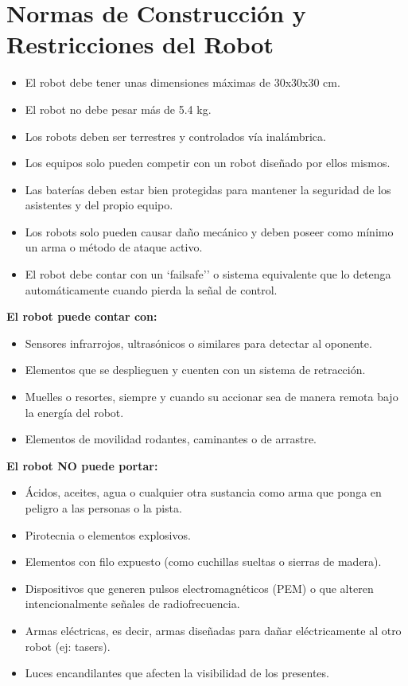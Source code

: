 \documentclass[12pt,a4paper]{article}
\begin{document}
\section*{Normas de Construcción y Restricciones del Robot}
\begin{itemize}
    \item El robot debe tener unas dimensiones máximas de 30x30x30 cm.
    \item El robot no debe pesar más de 5.4 kg.
    \item Los robots deben ser terrestres y controlados vía inalámbrica.
    \item Los equipos solo pueden competir con un robot diseñado por ellos mismos.
    \item Las baterías deben estar bien protegidas para mantener la seguridad de los asistentes y del propio equipo.
    \item Los robots solo pueden causar daño mecánico y deben poseer como mínimo un arma o método de ataque activo.
    \item El robot debe contar con un `failsafe'' o sistema equivalente que lo detenga automáticamente cuando pierda la señal de control.
\end{itemize}

\textbf{El robot puede contar con:}
\begin{itemize}
    \item Sensores infrarrojos, ultrasónicos o similares para detectar al oponente.
    \item Elementos que se desplieguen y cuenten con un sistema de retracción.
    \item Muelles o resortes, siempre y cuando su accionar sea de manera remota bajo la energía del robot.
    \item Elementos de movilidad rodantes, caminantes o de arrastre.
\end{itemize}

\textbf{El robot NO puede portar:}
\begin{itemize}
    \item Ácidos, aceites, agua o cualquier otra sustancia como arma que ponga en peligro a las personas o la pista.
    \item Pirotecnia o elementos explosivos.
    \item Elementos con filo expuesto (como cuchillas sueltas o sierras de madera).
    \item Dispositivos que generen pulsos electromagnéticos (PEM) o que alteren intencionalmente señales de radiofrecuencia.
    \item Armas eléctricas, es decir, armas diseñadas para dañar eléctricamente al otro robot (ej: tasers).
    \item Luces encandilantes que afecten la visibilidad de los presentes.
\end{itemize}
\end{document}
